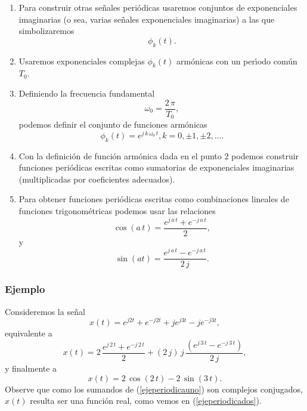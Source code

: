 \begin{enumerate}
\item Para construir otras se\~{n}ales peri\'{o}dicas usaremos
  conjuntos de exponenciales imaginarias (o sea, varias se\~{n}ales exponenciales imaginarias) a las que simbolizaremos
  \begin{equation}
    \phi _{k}\left( t\right) .
  \end{equation}
        
\item Usaremos exponenciales complejas $\phi_{k}(t)$ arm\'{o}nicas con un per\'{\i}odo com\'{u}n $T_{0}$.
  
\item
  Definiendo la frecuencia fundamental
  \begin{equation}
    \omega_{0}=\frac{2 \, \pi }{T_{0}},
  \end{equation}
  podemos definir el conjunto de funciones arm\'{o}nicas
  \begin{equation}
    \phi _{k}\left( t\right) = e^{j \, k \, \omega_{0} \, t}, k=0,\pm 1,\pm 2,....
  \end{equation}
        
\item Con la definici\'{o}n de funci\'{o}n arm\'{o}nica dada en el
  punto $2$ podemos construir funciones peri\'{o}dicas escritas como
  sumatorias de exponenciales imaginarias (multiplicadas por coeficientes adecuados).

\item Para obtener funciones peri\'{o}dicas escritas como combinaciones lineales
  de funciones trigonom\'{e}tricas podemos usar las relaciones
  \begin{equation}
    \cos \left(a \, t \right) = \frac{e^{j \, a \, t} + e^{-j \, a \, t}}{2},
  \end{equation}
  y
  \begin{equation}
    \sin \left(a t \right) = \frac{e^{j \, a \, t} - e^{-j \, a \, t}}{2 \, j}.
  \end{equation}

\end{enumerate}

\subsubsection{Ejemplo}

Consideremos la se\~{n}al
\begin{equation}
  x(t)= e^{j2t} + e^{-j2t} + j e^{j3t} - j e^{-j3t},      \label{ejeperiodicauno}
\end{equation}
equivalente a
\begin{equation}
  x(t)= 2 \, \frac{e^{j \, 2 \, t} + e^{-j \, 2 \, t}}{2} + (2 \, j) \, j \, \frac{(e^{j \, 3 \, t} - e^{-j \, 3 \, t})}{2 \, j},
\end{equation}
y finalmente a
\begin{equation}
  x(t)= 2 \, \cos \left(2 \, t \right) - 2 \, \sin \left(3 \, t \right). \label{ejeperiodicados}
\end{equation}
Observe que como los sumandos de (\ref{ejeperiodicauno}) son complejos
conjugados, $x(t)$ resulta ser una funci\'{o}n real, como vemos en
(\ref{ejeperiodicados}).

